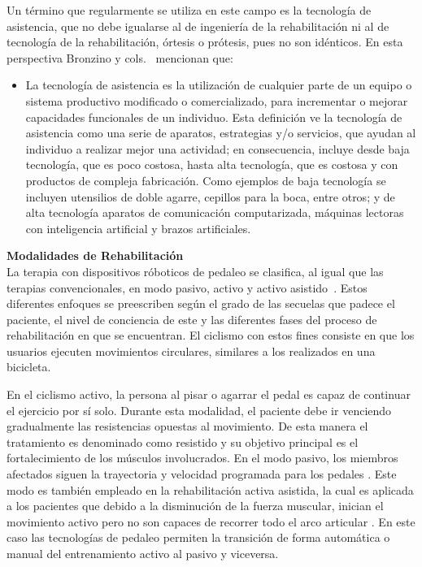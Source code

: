 Un término que regularmente se utiliza en este campo es la tecnología de asistencia, que no debe igualarse al de ingeniería de la rehabilitación ni al de tecnología de la rehabilitación, órtesis o prótesis, pues no son idénticos. En esta perspectiva Bronzino y cols.~\cite{enderle2012introduction} mencionan que:

\begin{itemize}
    \item  La tecnología de asistencia es la utilización de cualquier parte de un equipo o sistema productivo modificado o comercializado, para incrementar o mejorar capacidades funcionales de un individuo. Esta definición ve la tecnología de asistencia como una serie de aparatos, estrategias y/o servicios, que ayudan al individuo a realizar mejor una actividad; en consecuencia, incluye desde baja tecnología, que es poco costosa, hasta alta tecnología, que es costosa y con productos de compleja fabricación. Como ejemplos de baja tecnología se incluyen utensilios de doble agarre, cepillos para la boca, entre otros; y de alta tecnología aparatos de comunicación computarizada, máquinas lectoras con inteligencia artificial y brazos artificiales.
\end{itemize}

\textbf{Modalidades de Rehabilitación} \\ 
La terapia con dispositivos róboticos de pedaleo se clasifica, al igual que las terapias convencionales, en modo pasivo, activo y activo asistido~\cite{barclay2019effect}. Estos diferentes enfoques se preescriben según el grado de las secuelas que padece el paciente, el nivel de conciencia de este y las diferentes fases del proceso de rehabilitación en que se encuentran. El ciclismo con estos fines consiste en que los usuarios ejecuten movimientos circulares, similares a los realizados en una bicicleta.

En el ciclismo activo, la persona al pisar o agarrar el pedal es capaz de continuar el ejercicio por sí solo. Durante esta modalidad, el paciente debe ir venciendo gradualmente las resistencias opuestas al movimiento. De esta manera el tratamiento es denominado como resistido y su objetivo principal es el fortalecimiento de los músculos involucrados. En el modo pasivo, los miembros afectados siguen la trayectoria y velocidad programada para los pedales \cite{ferreira2020virtual}. Este modo es también empleado en la rehabilitación activa asistida, la cual es aplicada a los pacientes que debido a la disminución de la fuerza muscular, inician el movimiento activo pero no son capaces de recorrer todo el arco articular \cite{cruz2009guia}. En este caso las tecnologías de pedaleo permiten la transición de forma automática o manual del entrenamiento activo al pasivo y viceversa.

